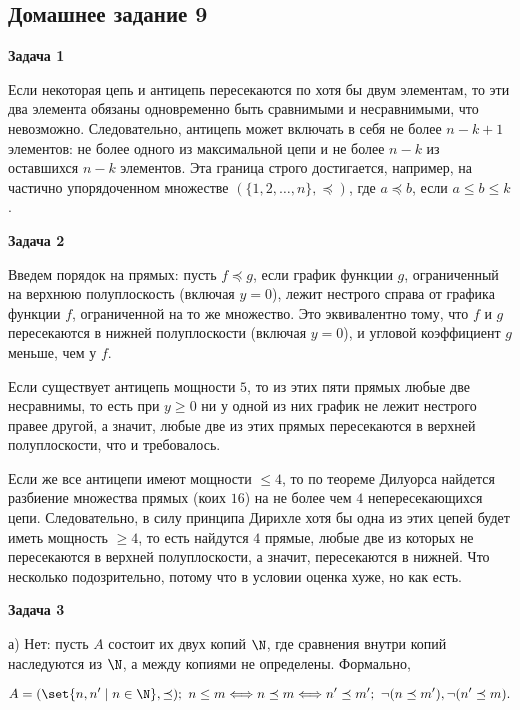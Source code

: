 \subsection{Домашнее задание 9}


	\begin{center}
    \textbf{Задача 1}
\end{center}
		Если некоторая цепь и антицепь пересекаются по хотя бы двум элементам, то эти два элемента обязаны одновременно быть сравнимыми и несравнимыми, что невозможно. Следовательно, антицепь может включать в себя не более $n - k + 1$ элементов: не более одного из максимальной цепи и не более $n - k$ из оставшихся $n - k$ элементов. Эта граница строго достигается, например, на частично упорядоченном множестве $(\{1, 2, \dots, n\}, \preceq)$, где $a \preceq b$, если $a \le b \le k$.


	\begin{center}
    \textbf{Задача 2}
\end{center}
		Введем порядок на прямых: пусть $f \preceq g$, если график функции $g$, ограниченный на верхнюю полуплоскость (включая $y = 0$), лежит нестрого справа от графика функции $f$, ограниченной на то же множество. Это эквивалентно тому, что $f$ и $g$ пересекаются в нижней полуплоскости (включая $y = 0$), и угловой коэффициент $g$ меньше, чем у $f$.

		Если существует антицепь мощности $5$, то из этих пяти прямых любые две несравнимы, то есть при $y \ge 0$ ни у одной из них график не лежит нестрого правее другой, а значит, любые две из этих прямых пересекаются в верхней полуплоскости, что и требовалось.

		Если же все антицепи имеют мощности $\le 4$, то по теореме Дилуорса найдется разбиение множества прямых (коих $16$) на не более чем $4$ непересекающихся цепи. Следовательно, в силу принципа Дирихле хотя бы одна из этих цепей будет иметь мощность $\ge 4$, то есть найдутся $4$ прямые, любые две из которых не пересекаются в верхней полуплоскости, а значит, пересекаются в нижней. Что несколько подозрительно, потому что в условии оценка хуже, но как есть.


	\begin{center}
    \textbf{Задача 3}
\end{center}
		а) Нет: пусть $A$ состоит их двух копий $\N$, где сравнения внутри копий наследуются из $\N$, а между копиями не определены. Формально,

		\begin{equation*}
			A = (\set{n, n' \mid n \in \N}, \preceq); \ n \le m \Longleftrightarrow n \preceq m \Longleftrightarrow n' \preceq m'; \ \neg (n \preceq m'), \neg (n' \preceq m).
		\end{equation*}

